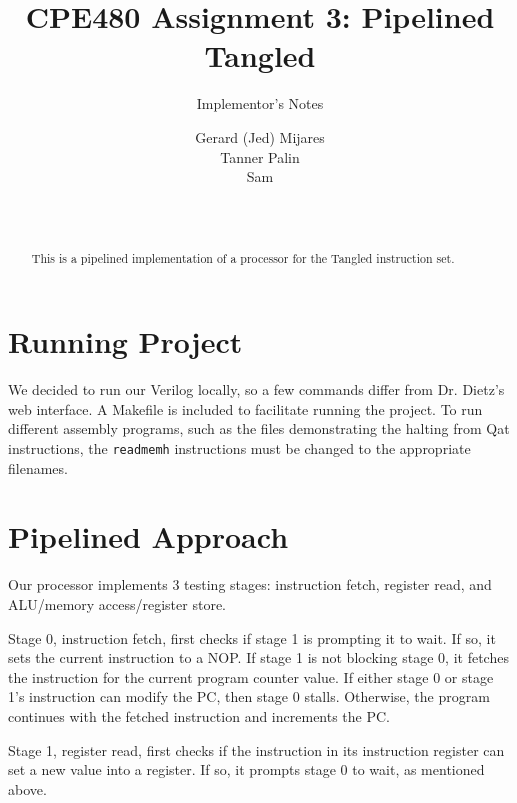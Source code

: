 \documentclass{sig-alternate-05-2015}
\begin{document}

\title{CPE480 Assignment 3: Pipelined Tangled }
\subtitle{Implementor's Notes}

\author{
Gerard (Jed) Mijares\\
Tanner Palin\\
Sam\\
       \\
       \\
}

\maketitle
\begin{abstract}
This is a pipelined implementation of a processor for the Tangled instruction set. 
\end{abstract}

\section{Running Project}

We decided to run our Verilog locally, so a few commands differ from Dr. Dietz's web interface. A Makefile is included to facilitate running the project. To run different assembly programs, such as the files demonstrating the halting from Qat instructions, the \texttt{readmemh} instructions must be changed to the appropriate filenames.

\section{Pipelined Approach}

Our processor implements 3 testing stages: instruction fetch, register read, and ALU/memory access/register store.

Stage 0, instruction fetch, first checks if stage 1 is prompting it to wait. If so, it sets the current instruction to a NOP. If stage 1 is not blocking stage 0, it fetches the instruction for the current program counter value. If either stage 0 or stage 1's instruction can modify the PC, then stage 0 stalls. Otherwise, the program continues with the fetched instruction and increments the PC.

Stage 1, register read, first checks if the instruction in its instruction register can set a new value into a register. If so, it prompts stage 0 to wait, as mentioned above.
\end{document}
